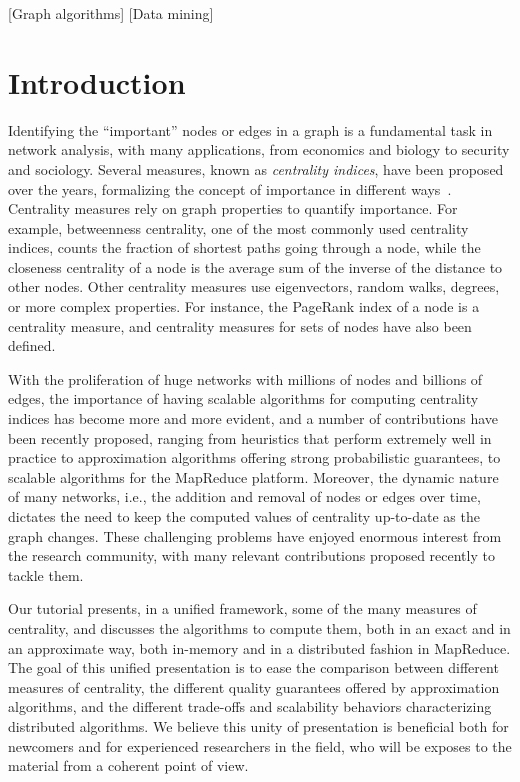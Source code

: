 \documentclass[pdfpagelabels=false]{sig-alternate-2013} %
\begin{document}
[Graph algorithms]
[Data mining]


\section{Introduction}
Identifying the ``important'' nodes or edges in a graph is a fundamental task
in network analysis, with many applications, from economics and biology to security and sociology.
Several measures, known as \emph{centrality indices}, have been proposed over the years, 
formalizing the concept of importance in different ways~\citep{Newman10}. Centrality measures
rely on graph properties to quantify importance. For example, betweenness
centrality, one of the most commonly used centrality indices, counts the fraction
of shortest paths going through a node, while the closeness centrality of a node
is the average sum of the inverse of the distance to other nodes. Other
centrality measures use eigenvectors, random walks, degrees, or more complex
properties. For instance, the PageRank index of a node is a centrality measure, and
centrality measures for sets of nodes have also been defined.

With the proliferation of huge networks with millions of nodes and billions of
edges, the importance of having scalable algorithms for computing centrality
indices has become more and more evident, and a number of contributions have been
recently proposed, ranging from heuristics that perform extremely well in
practice to approximation algorithms offering strong probabilistic guarantees,
to scalable algorithms for the MapReduce platform. Moreover, the dynamic nature
of many networks, i.e., the addition and removal of nodes or edges over
time, dictates the need to keep the computed values of centrality up-to-date as
the graph changes. These challenging problems have enjoyed enormous interest
from the research community, with many relevant contributions proposed recently
to tackle them.

Our tutorial presents, in a unified framework, some of the many measures of
centrality, and discusses the algorithms to compute them, both in an exact and in
an approximate way, both in-memory and in a distributed fashion in MapReduce.
The goal of this unified presentation is to ease the
comparison between different measures of centrality, the different quality
guarantees offered by approximation algorithms, and the different trade-offs and
scalability behaviors characterizing distributed algorithms. We believe
this unity of presentation is beneficial both for newcomers and for
experienced researchers in the field, who will be exposes to the material from a
coherent point of view.
\end{document}
